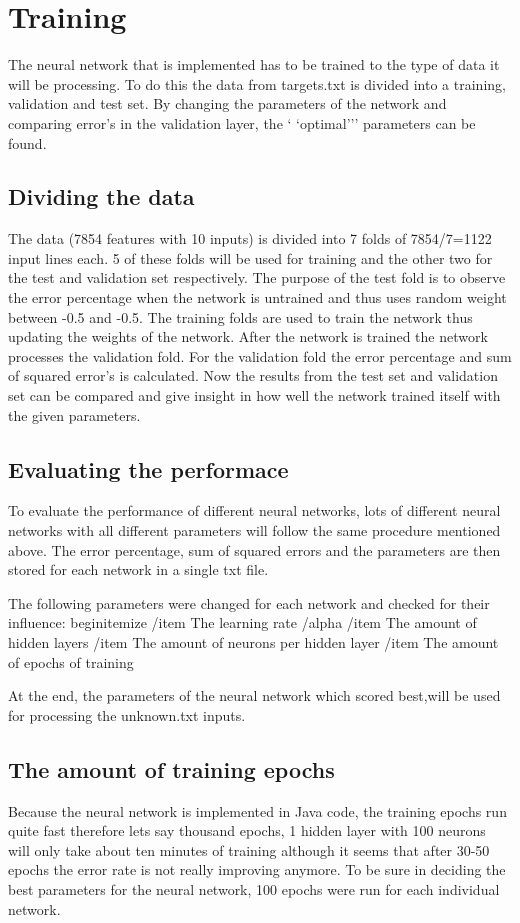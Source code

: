 \section{Training} \label {chapter:training}

The neural network that is implemented has to be trained to the type of data it will be processing. To do this the data from targets.txt is divided into a training, validation and test set. By changing the parameters of the network and comparing error's in the validation layer, the ` `optimal''' parameters can be found.

\subsection{Dividing the data}
The data (7854 features with 10 inputs) is divided into 7 folds of 7854/7=1122 input lines each. 5 of these folds will be used for training and the other two for the test and validation set respectively. The purpose of the test fold is to observe the error percentage when the network is untrained  and thus uses random weight between -0.5 and -0.5. The training folds are used to train the network thus updating the weights of the network. After the network is trained the network processes the validation fold. For the validation fold the error percentage and sum of squared error's is calculated. Now the results from the test set and validation set can be compared and give insight in how well the network trained itself with the given parameters. 

\subsection{Evaluating the performace}
To evaluate the performance of different neural networks, lots of different neural networks with all different parameters will follow the same procedure mentioned above. The error percentage, sum of squared errors and the parameters are then stored for each network in a single txt file. 

The following parameters were changed for each network and checked for their influence:
begin{itemize}
/item The learning rate /alpha
/item The amount of hidden layers
/item The amount of neurons per hidden layer
/item The amount of epochs of training


At the end, the parameters of the neural network which scored best,will be used for processing the unknown.txt inputs. 

 \subsection{The amount of training epochs}
 Because the neural network is implemented in Java code, the training epochs run quite fast therefore lets say thousand epochs, 1 hidden layer with 100 neurons will only take about ten minutes of training although it seems that after 30-50 epochs the error rate is not really improving anymore. To be sure in deciding the best parameters for the neural network, 100 epochs were run for each individual network.
 

